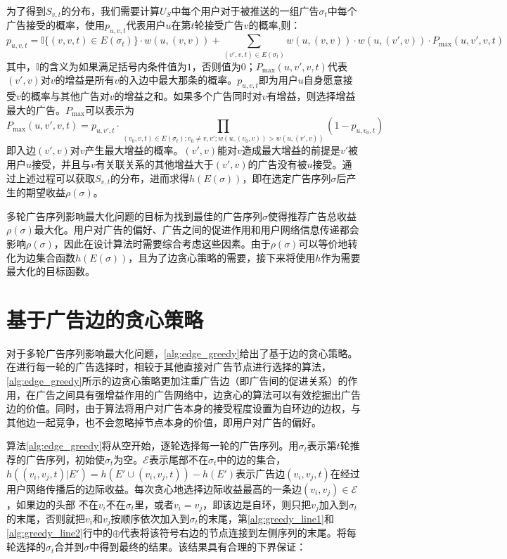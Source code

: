 为了得到$S_{v,t}$的分布，我们需要计算$U_S$中每个用户对于被推送的一组广告$\sigma_t$中每个广告接受的概率，使用$p_{u,v,t}$代表用户$u$在第$t$轮接受广告$v$的概率,则\label{sec:puvt}：
\begin{equation}
p_{u,v,t}=\mathbb{I}\{(v,v,t)\in E(\sigma_t)\}\cdot w(u,(v,v)) + \sum_{(v',v,t)\in E(\sigma_t)}w(u,(v,v))\cdot w(u,(v',v))\cdot P_{\max}(u,v',v,t)
\end{equation}
\noindent 其中，$\mathbb{I}$的含义为如果满足括号内条件值为$1$，否则值为$0$；$P_{\max}(u,v',v,t)$代表$(v',v)$对$v$的增益是所有$v$的入边中最大那条的概率。$p_{u,v,t}$即为用户$u$自身愿意接受$v$的概率与其他广告对$v$的增益之和。如果多个广告同时对$v$有增益，则选择增益最大的广告。$P_{\max}$可以表示为
\begin{equation}
    P_{\max}(u,v',v,t)=p_{u,v',t}\cdot \prod_{(v_0,v,t)\in E(\sigma_t);v_0\neq v,v';w(u,(v_0,v))>w(u,(v',v))}(1-p_{u,v_0,t})
\end{equation}
\noindent 即入边$(v',v)$对$v$产生最大增益的概率。$(v',v)$能对$v$造成最大增益的前提是$v'$被用户$u$接受，并且与$v$有关联关系的其他增益大于$(v',v)$的广告没有被$u$接受。通过上述过程可以获取$S_{v,t}$的分布，进而求得$h(E(\sigma))$，即在选定广告序列$\sigma$后产生的期望收益$\rho(\sigma)$。

多轮广告序列影响最大化问题的目标为找到最佳的广告序列$\sigma$使得推荐广告总收益$\rho(\sigma)$最大化。用户对广告的偏好、广告之间的促进作用和用户网络信息传递都会影响$\rho(\sigma)$，因此在设计算法时需要综合考虑这些因素。由于$\rho(\sigma)$可以等价地转化为边集合函数$h(E(\sigma))$，且为了边贪心策略的需要，接下来将使用$h$作为需要最大化的目标函数。

\section{基于广告边的贪心策略}
\label{sec:greedy}
对于多轮广告序列影响最大化问题，\autoref{alg:edge_greedy}给出了基于边的贪心策略。在进行每一轮的广告选择时，相较于其他直接对广告节点进行选择的算法\cite{kempe2008ad1,tang2017robust,tang2018social}，\autoref{alg:edge_greedy}所示的边贪心策略更加注重广告边（即广告间的促进关系）的作用，在广告之间具有强增益作用的广告网络中，边贪心的算法可以有效挖掘出广告边的价值。同时，由于算法将用户对广告本身的接受程度设置为自环边的边权，与其他边一起竞争，也不会忽略掉节点本身的价值，即用户对广告的偏好。

算法\ref{alg:edge_greedy}将从空开始，逐轮选择每一轮的广告序列。用$\sigma_t$表示第$t$轮推荐的广告序列，初始使$\sigma_t$为空。$\mathcal{E}$表示尾部不在$\sigma_t$中的边的集合，$h((v_i,v_j,t)|E')=h(E'\cup{(v_i,v_j,t)})-h(E')$表示广告边$(v_i,v_j,t)$在经过用户网络传播后的边际收益。每次贪心地选择边际收益最高的一条边$(v_i,v_j)\in \mathcal{E}$，如果边的头部 不在$v_i$不在$\sigma_t$里，或者$v_i=v_j$，即该边是自环，则只把$v_j$加入到$\sigma_t$的末尾，否则就把$v_i$和$v_j$按顺序依次加入到$\sigma_t$的末尾，第\ref{alg:greedy_line1}和\ref{alg:greedy_line2}行中的$\oplus$代表将该符号右边的节点连接到左侧序列的末尾。将每轮选择的$\sigma_t$合并到$\sigma$中得到最终的结果。该结果具有合理的下界保证：

